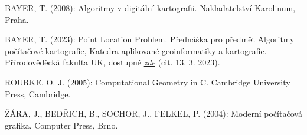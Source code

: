 \begin{thebibliography}{9}
BAYER, T. (2008): Algoritmy v digitální kartografii. Nakladatelství Karolinum, Praha.

BAYER, T. (2023): Point Location Problem. Přednáška pro předmět Algoritmy počítačové kartografie, Katedra aplikované geoinformatiky a kartografie. Přírodověděcká fakulta UK, dostupné \href{http://web.natur.cuni.cz/~bayertom/images/courses/Adk/adk3_new.pdf}{\emph{zde}} (cit. 13. 3. 2023).

ROURKE, O. J. (2005): Computational Geometry in C. Cambridge University Press, Cambridge.

ŽÁRA, J., BEDŘICH, B., SOCHOR, J., FELKEL, P. (2004): Moderní počítačová grafika. Computer Press, Brno.
\end{thebibliography}
